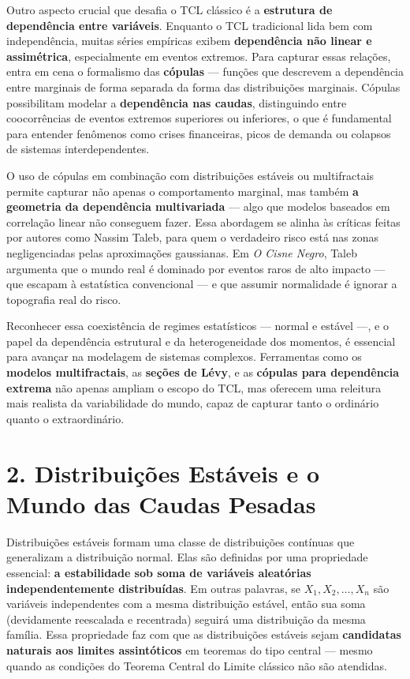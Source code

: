 \documentclass[
  portuguese,
]{agujournal2019}
\begin{document}
Outro aspecto crucial que desafia o TCL clássico é a \textbf{estrutura
de dependência entre variáveis}. Enquanto o TCL tradicional lida bem com
independência, muitas séries empíricas exibem \textbf{dependência não
linear e assimétrica}, especialmente em eventos extremos. Para capturar
essas relações, entra em cena o formalismo das \textbf{cópulas} ---
funções que descrevem a dependência entre marginais de forma separada da
forma das distribuições marginais. Cópulas possibilitam modelar a
\textbf{dependência nas caudas}, distinguindo entre coocorrências de
eventos extremos superiores ou inferiores, o que é fundamental para
entender fenômenos como crises financeiras, picos de demanda ou colapsos
de sistemas interdependentes.

O uso de cópulas em combinação com distribuições estáveis ou
multifractais permite capturar não apenas o comportamento marginal, mas
também \textbf{a geometria da dependência multivariada} --- algo que
modelos baseados em correlação linear não conseguem fazer. Essa
abordagem se alinha às críticas feitas por autores como Nassim Taleb,
para quem o verdadeiro risco está nas zonas negligenciadas pelas
aproximações gaussianas. Em \emph{O Cisne Negro}, Taleb argumenta que o
mundo real é dominado por eventos raros de alto impacto --- que escapam
à estatística convencional --- e que assumir normalidade é ignorar a
topografia real do risco.

Reconhecer essa coexistência de regimes estatísticos --- normal e
estável ---, e o papel da dependência estrutural e da heterogeneidade
dos momentos, é essencial para avançar na modelagem de sistemas
complexos. Ferramentas como os \textbf{modelos multifractais}, as
\textbf{seções de Lévy}, e as \textbf{cópulas para dependência extrema}
não apenas ampliam o escopo do TCL, mas oferecem uma releitura mais
realista da variabilidade do mundo, capaz de capturar tanto o ordinário
quanto o extraordinário.

\section{2. Distribuições Estáveis e o Mundo das Caudas
Pesadas}\label{distribuiuxe7uxf5es-estuxe1veis-e-o-mundo-das-caudas-pesadas}

Distribuições estáveis formam uma classe de distribuições contínuas que
generalizam a distribuição normal. Elas são definidas por uma
propriedade essencial: \textbf{a estabilidade sob soma de variáveis
aleatórias independentemente distribuídas}. Em outras palavras, se
\(X_1, X_2, \dots, X_n\) são variáveis independentes com a mesma
distribuição estável, então sua soma (devidamente reescalada e
recentrada) seguirá uma distribuição da mesma família. Essa propriedade
faz com que as distribuições estáveis sejam \textbf{candidatas naturais
aos limites assintóticos} em teoremas do tipo central --- mesmo quando
as condições do Teorema Central do Limite clássico não são atendidas.
\end{document}
